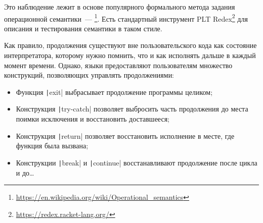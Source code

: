 Это наблюдение лежит в основе популярного формального метода задания операционной семантики~--- \footnote{\url{https://en.wikipedia.org/wiki/Operational_semantics}}.
Есть стандартный инструмент PLT Redex\footnote{\url{https://redex.racket-lang.org/}} для описания и тестирования семантики в таком стиле.

Как правило, продолжения существуют вне пользовательского кода как состояние интерпретатора, которому нужно помнить, что и как исполнять дальше в каждый момент времени.
Однако, языки предоставляют пользователям множество конструкций, позволяющих управлять продолжениями:

\begin{itemize}
    \item Функция \texttt|exit| выбрасывает продолжение программы целиком;
    \item Конструкция \texttt|try-catch| позволяет выбросить часть продолжения до места поимки исключения и восстановить доставшееся;
    \item Конструкция \texttt|return| позволяет восстановить исполнение в месте, где функция была вызвана;
    \item Конструкции \texttt|break| и \texttt|continue| восстанавливают продолжение после цикла и до\ldots
\end{itemize}

